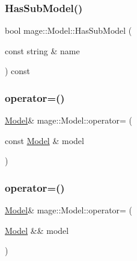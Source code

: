 \subsubsection{\texorpdfstring{Has\+Sub\+Model()}{HasSubModel()}}
{\footnotesize\ttfamily bool mage\+::\+Model\+::\+Has\+Sub\+Model (\begin{DoxyParamCaption}\item[{const string \&}]{name }\end{DoxyParamCaption}) const}

\hypertarget{classmage_1_1_model_a563515c64ec39cfcda9f6ca37576391b}{}\label{classmage_1_1_model_a563515c64ec39cfcda9f6ca37576391b} 
\subsubsection{\texorpdfstring{operator=()}{operator=()}\hspace{0.1cm}{\footnotesize\ttfamily [1/2]}}
{\footnotesize\ttfamily \hyperlink{classmage_1_1_model}{Model}\& mage\+::\+Model\+::operator= (\begin{DoxyParamCaption}\item[{const \hyperlink{classmage_1_1_model}{Model} \&}]{model }\end{DoxyParamCaption})\hspace{0.3cm}{\ttfamily [delete]}}

\hypertarget{classmage_1_1_model_a084e30d15822bfefa79128f30a57cc02}{}\label{classmage_1_1_model_a084e30d15822bfefa79128f30a57cc02} 
\subsubsection{\texorpdfstring{operator=()}{operator=()}\hspace{0.1cm}{\footnotesize\ttfamily [2/2]}}
{\footnotesize\ttfamily \hyperlink{classmage_1_1_model}{Model}\& mage\+::\+Model\+::operator= (\begin{DoxyParamCaption}\item[{\hyperlink{classmage_1_1_model}{Model} \&\&}]{model }\end{DoxyParamCaption})\hspace{0.3cm}{\ttfamily [delete]}}

\hypertarget{classmage_1_1_model_a2f3c812220367093bdca125e6b6e898a}{}\label{classmage_1_1_model_a2f3c812220367093bdca125e6b6e898a} 
